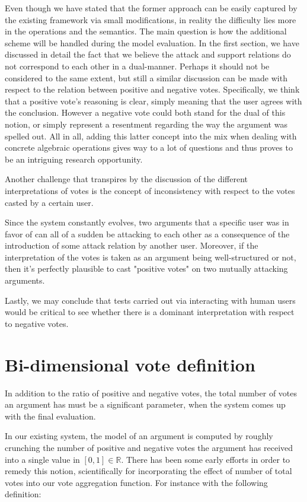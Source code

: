 \documentclass{article}
\begin{document}
{\color{red}
Even though we have stated that the former approach can be easily captured by the existing framework via small modifications, in reality the difficulty lies more in the operations and the semantics. The main question is how the additional scheme will be handled during the model evaluation. In the first section, we have discussed in detail the fact that we believe the attack and support relations do not correspond to each other in a dual-manner. Perhaps it should not be considered to the same extent, but still a similar discussion can be made with respect to the relation between positive and negative votes. Specifically, we think that a positive vote's reasoning is clear, simply meaning that the user agrees with the conclusion. However a negative vote could both stand for the dual of this notion, or simply represent a resentment regarding the way the argument was spelled out. All in all, adding this latter concept into the mix when dealing with concrete algebraic operations gives way to a lot of questions and thus proves to be an intriguing research opportunity.

Another challenge that transpires by the discussion of the different interpretations of votes is the concept of inconsistency with respect to the votes casted by a certain user. }Since the system constantly evolves, two arguments that a specific user was in favor of can all of a sudden be attacking to each other as a consequence of the introduction of some attack relation by another user. Moreover, if the interpretation of the votes is taken as an argument being well-structured or not, then it's perfectly plausible to cast "positive votes" on two mutually attacking arguments.

Lastly, we may conclude that tests carried out via interacting with human users would be critical to see whether there is a dominant interpretation with respect to negative votes. 



\section{Bi-dimensional vote definition}
In addition to the ratio of positive and negative votes, the total number of votes an argument has must be a significant parameter, when the system comes up with the final evaluation.

 In our existing system, the model of an argument is computed by roughly crunching  the number of positive and negative votes the argument has received into a single value in  $[0,1] \in \mathbb{R}$. There has been some early efforts in order to remedy this notion, scientifically for incorporating the effect of number of total votes into our vote aggregation function. For instance with the following definition:
\end{document}
